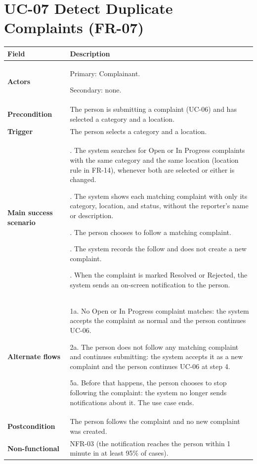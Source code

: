 \documentclass[11pt,a4paper]{report}
\begin{document}
\section{UC-07 Detect Duplicate Complaints (FR-07)}
\begin{longtable}{|>{\raggedright\arraybackslash}p{3.0cm}|>{\raggedright\arraybackslash}p{12.4cm}|}
\hline \textbf{Field} & \textbf{Description} \\ \hline \endhead
\textbf{Actors} & Primary: Complainant.\par\smallskip Secondary: none. \\ \hline
\textbf{Precondition} & The person is submitting a complaint (UC-06) and has selected a category and a location. \\ \hline
\textbf{Trigger} & The person selects a category and a location. \\ \hline
\textbf{Main success scenario} & 1. The system searches for Open or In Progress complaints with the same category and the same location (location rule in FR-14), whenever both are selected or either is changed.\par\smallskip 2. The system shows each matching complaint with only its category, location, and status, without the reporter's name or description.\par\smallskip 3. The person chooses to follow a matching complaint.\par\smallskip 4. The system records the follow and does not create a new complaint.\par\smallskip 5. When the complaint is marked Resolved or Rejected, the system sends an on-screen notification to the person. \\ \hline
\textbf{Alternate flows} & 1a. No Open or In Progress complaint matches: the system accepts the complaint as normal and the person continues UC-06.\par\smallskip 2a. The person does not follow any matching complaint and continues submitting: the system accepts it as a new complaint and the person continues UC-06 at step 4.\par\smallskip 5a. Before that happens, the person chooses to stop following the complaint: the system no longer sends notifications about it. The use case ends. \\ \hline
\textbf{Postcondition} & The person follows the complaint and no new complaint was created. \\ \hline
\textbf{Non-functional} & NFR-03 (the notification reaches the person within 1 minute in at least 95\% of cases). \\ \hline
\end{longtable}
\end{document}
